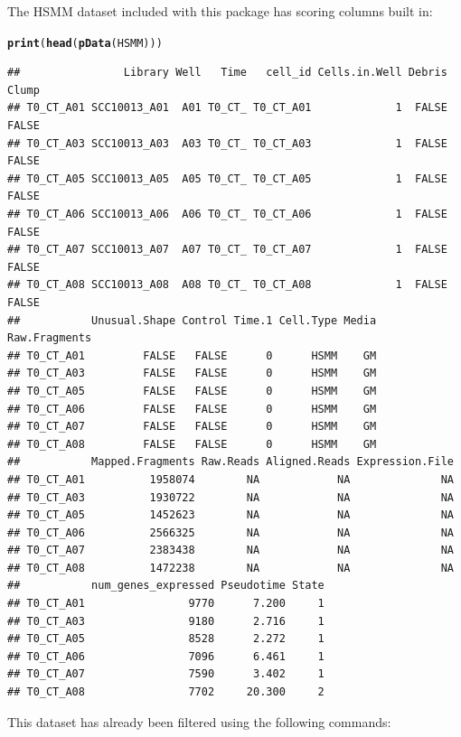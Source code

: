 \documentclass[10pt,oneside]{article}\usepackage[]{graphicx}\usepackage[]{color}
\makeatletter
\newcommand{\hlstd}[1]{\textcolor[rgb]{0.345,0.345,0.345}{#1}}%
\newcommand{\hlkwd}[1]{\textcolor[rgb]{0.737,0.353,0.396}{\textbf{#1}}}%
\newenvironment{kframe}{%
 \def\at@end@of@kframe{}%
 \ifinner\ifhmode%
  \def\at@end@of@kframe{\end{minipage}}%
  \begin{minipage}{\columnwidth}%
 \fi\fi%
 \def\FrameCommand##1{\hskip\@totalleftmargin \hskip-\fboxsep
 \colorbox{shadecolor}{##1}\hskip-\fboxsep
     \hskip-\linewidth \hskip-\@totalleftmargin \hskip\columnwidth}%
 \MakeFramed {\advance\hsize-\width
   \@totalleftmargin\z@ \linewidth\hsize
   \@setminipage}}%
 {\par\unskip\endMakeFramed%
 \at@end@of@kframe}
\newenvironment{knitrout}{}{} %
\makeatother
\begin{document}
The HSMM dataset included with this package has scoring columns built in: 
\begin{knitrout}
\color{fgcolor}\begin{kframe}
\begin{alltt}
\hlkwd{print}\hlstd{(}\hlkwd{head}\hlstd{(}\hlkwd{pData}\hlstd{(HSMM)))}
\end{alltt}
\begin{verbatim}
##                Library Well   Time   cell_id Cells.in.Well Debris Clump
## T0_CT_A01 SCC10013_A01  A01 T0_CT_ T0_CT_A01             1  FALSE FALSE
## T0_CT_A03 SCC10013_A03  A03 T0_CT_ T0_CT_A03             1  FALSE FALSE
## T0_CT_A05 SCC10013_A05  A05 T0_CT_ T0_CT_A05             1  FALSE FALSE
## T0_CT_A06 SCC10013_A06  A06 T0_CT_ T0_CT_A06             1  FALSE FALSE
## T0_CT_A07 SCC10013_A07  A07 T0_CT_ T0_CT_A07             1  FALSE FALSE
## T0_CT_A08 SCC10013_A08  A08 T0_CT_ T0_CT_A08             1  FALSE FALSE
##           Unusual.Shape Control Time.1 Cell.Type Media Raw.Fragments
## T0_CT_A01         FALSE   FALSE      0      HSMM    GM              
## T0_CT_A03         FALSE   FALSE      0      HSMM    GM              
## T0_CT_A05         FALSE   FALSE      0      HSMM    GM              
## T0_CT_A06         FALSE   FALSE      0      HSMM    GM              
## T0_CT_A07         FALSE   FALSE      0      HSMM    GM              
## T0_CT_A08         FALSE   FALSE      0      HSMM    GM              
##           Mapped.Fragments Raw.Reads Aligned.Reads Expression.File
## T0_CT_A01          1958074        NA            NA              NA
## T0_CT_A03          1930722        NA            NA              NA
## T0_CT_A05          1452623        NA            NA              NA
## T0_CT_A06          2566325        NA            NA              NA
## T0_CT_A07          2383438        NA            NA              NA
## T0_CT_A08          1472238        NA            NA              NA
##           num_genes_expressed Pseudotime State
## T0_CT_A01                9770      7.200     1
## T0_CT_A03                9180      2.716     1
## T0_CT_A05                8528      2.272     1
## T0_CT_A06                7096      6.461     1
## T0_CT_A07                7590      3.402     1
## T0_CT_A08                7702     20.300     2
\end{verbatim}
\end{kframe}
\end{knitrout}


This dataset has already been filtered using the following commands: 
\end{document}
